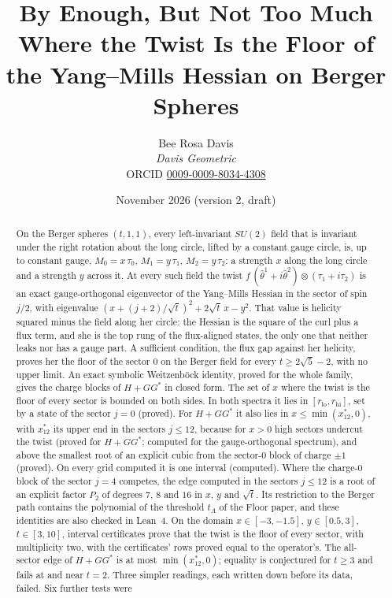 \documentclass[11pt]{article}
\title{By Enough, But Not Too Much\\[4pt] \large Where the Twist Is the Floor of the Yang--Mills Hessian on Berger Spheres}
\author{Bee Rosa Davis\\[1pt] {\normalsize\upshape\itshape Davis Geometric}\\[1pt]
{\footnotesize\upshape ORCID \href{https://orcid.org/0009-0009-8034-4308}{0009-0009-8034-4308}}}
\date{November 2026 (version 2, draft)}
\theoremstyle{definition}
\theoremstyle{remark}
\begin{document}
\maketitle

\begin{abstract}
On the Berger spheres $(t,1,1)$, every left-invariant $SU(2)$ field that is invariant under the right rotation about
the long circle, lifted by a constant gauge circle, is, up to constant gauge, $M_0=x\,\tau_0$, $M_1=y\,\tau_1$,
$M_2=y\,\tau_2$: a strength $x$ along the long circle and a strength $y$ across it. At every such field the twist
$f\,(\hat\theta^1+i\hat\theta^2)\otimes(\tau_1+i\tau_2)$ is an exact gauge-orthogonal eigenvector of the Yang--Mills
Hessian in the sector of spin $j/2$, with eigenvalue $(x+(j+2)/\sqrt t)^2+2\sqrt t\,x-y^2$. That value is helicity squared minus the field along her
circle: the Hessian is the square of the curl plus a flux term, and she is the top rung of the flux-aligned states, the
only one that neither leaks nor has a gauge part. A sufficient condition, the flux gap against her helicity, proves her
the floor of the sector $0$ on the Berger field for every $t\ge2\sqrt5-2$, with no upper limit. An exact symbolic
Weitzenb\"ock identity, proved for the whole family, gives the charge blocks of $H+GG^*$ in closed form. The set of $x$
where the twist is the floor of every sector is bounded on both sides. In both spectra it lies in
$[r_{\mathrm{lo}},r_{\mathrm{hi}}]$, set by a state of the sector $j=0$ (proved). For $H+GG^*$ it also lies in
$x\le\min(x^*_{12},0)$, with $x^*_{12}$ its upper end in the sectors $j\le12$, because for $x>0$ high sectors undercut the twist (proved for $H+GG^*$; computed for the
gauge-orthogonal spectrum), and above the smallest root of an explicit cubic from the sector-$0$ block of charge $\pm1$
(proved). On every grid computed it is one interval (computed). Where the charge-$0$ block of
the sector $j=4$ competes, the edge computed in the sectors $j\le12$ is a root of an explicit factor $P_2$ of degrees $7$,
$8$ and $16$ in $x$, $y$ and $\sqrt t$. Its restriction to the Berger path contains the polynomial of the threshold
$t_A$ of the Floor paper, and these identities are also checked in Lean~4. On the domain $x\in[-3,-1.5]$,
$y\in[0.5,3]$, $t\in[3,10]$, interval certificates prove that the twist is the floor of every sector, with multiplicity
two, with the certificates' rows proved equal to the operator's. The all-sector edge of $H+GG^*$ is at most $\min(x^*_{12},0)$; equality is conjectured for $t\ge3$ and fails
at and near $t=2$. Three simpler readings, each written down before its data, failed. Six further tests were

\end{abstract}
\end{document}
